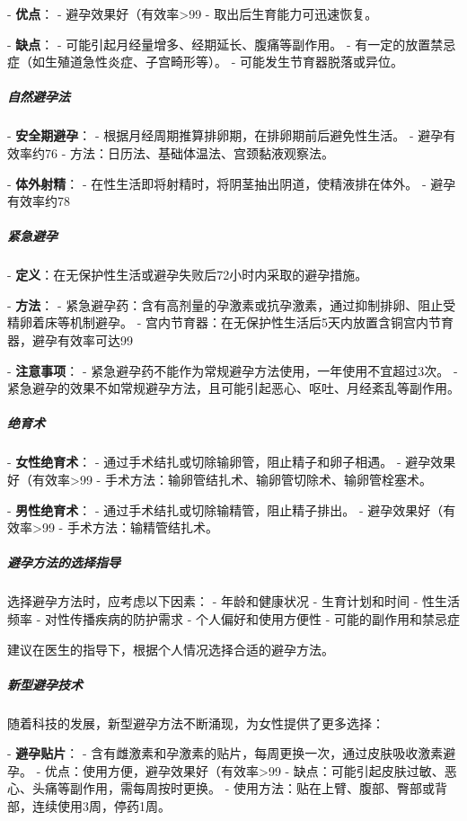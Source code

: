 \begin{enumerate}
- \textbf{优点}：
  - 避孕效果好（有效率>99%
  - 取出后生育能力可迅速恢复。

- \textbf{缺点}：
  - 可能引起月经量增多、经期延长、腹痛等副作用。
  - 有一定的放置禁忌症（如生殖道急性炎症、子宫畸形等）。
  - 可能发生节育器脱落或异位。

\subparagraph{自然避孕法}

- \textbf{安全期避孕}：
  - 根据月经周期推算排卵期，在排卵期前后避免性生活。
  - 避孕有效率约76%
  - 方法：日历法、基础体温法、宫颈黏液观察法。

- \textbf{体外射精}：
  - 在性生活即将射精时，将阴茎抽出阴道，使精液排在体外。
  - 避孕有效率约78%

\subparagraph{紧急避孕}

- \textbf{定义}：在无保护性生活或避孕失败后72小时内采取的避孕措施。

- \textbf{方法}：
  - 紧急避孕药：含有高剂量的孕激素或抗孕激素，通过抑制排卵、阻止受精卵着床等机制避孕。
  - 宫内节育器：在无保护性生活后5天内放置含铜宫内节育器，避孕有效率可达99%

- \textbf{注意事项}：
  - 紧急避孕药不能作为常规避孕方法使用，一年使用不宜超过3次。
  - 紧急避孕的效果不如常规避孕方法，且可能引起恶心、呕吐、月经紊乱等副作用。

\subparagraph{绝育术}

- \textbf{女性绝育术}：
  - 通过手术结扎或切除输卵管，阻止精子和卵子相遇。
  - 避孕效果好（有效率>99%
  - 手术方法：输卵管结扎术、输卵管切除术、输卵管栓塞术。

- \textbf{男性绝育术}：
  - 通过手术结扎或切除输精管，阻止精子排出。
  - 避孕效果好（有效率>99%
  - 手术方法：输精管结扎术。

\subparagraph{避孕方法的选择指导}

选择避孕方法时，应考虑以下因素：
- 年龄和健康状况
- 生育计划和时间
- 性生活频率
- 对性传播疾病的防护需求
- 个人偏好和使用方便性
- 可能的副作用和禁忌症

建议在医生的指导下，根据个人情况选择合适的避孕方法。

\subparagraph{新型避孕技术}

随着科技的发展，新型避孕方法不断涌现，为女性提供了更多选择：

- \textbf{避孕贴片}：
  - 含有雌激素和孕激素的贴片，每周更换一次，通过皮肤吸收激素避孕。
  - 优点：使用方便，避孕效果好（有效率>99%
  - 缺点：可能引起皮肤过敏、恶心、头痛等副作用，需每周按时更换。
  - 使用方法：贴在上臂、腹部、臀部或背部，连续使用3周，停药1周。


\end{enumerate}
